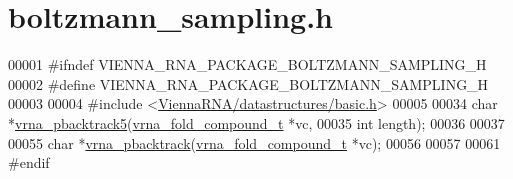 \hypertarget{boltzmann__sampling_8h_source}{}\section{boltzmann\+\_\+sampling.\+h}
\label{boltzmann__sampling_8h_source}

\begin{DoxyCode}
00001 \textcolor{preprocessor}{#ifndef VIENNA\_RNA\_PACKAGE\_BOLTZMANN\_SAMPLING\_H}
00002 \textcolor{preprocessor}{#define VIENNA\_RNA\_PACKAGE\_BOLTZMANN\_SAMPLING\_H}
00003 
00004 \textcolor{preprocessor}{#include <\hyperlink{datastructures_2basic_8h}{ViennaRNA/datastructures/basic.h}>}
00005 
00034 \textcolor{keywordtype}{char} *\hyperlink{group__subopt__stochbt_ga347375a4da8bdff74639529847f97d4f}{vrna\_pbacktrack5}(\hyperlink{group__fold__compound_structvrna__fc__s}{vrna\_fold\_compound\_t} *vc,
00035                        \textcolor{keywordtype}{int}                  length);
00036 
00037 
00055 \textcolor{keywordtype}{char} *\hyperlink{group__subopt__stochbt_ga901fe42a33b07be083421741bf7dc610}{vrna\_pbacktrack}(\hyperlink{group__fold__compound_structvrna__fc__s}{vrna\_fold\_compound\_t} *vc);
00056 
00057 
00061 \textcolor{preprocessor}{#endif}
\end{DoxyCode}
